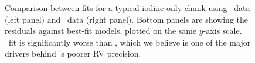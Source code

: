 \begin{figure}
\centering
{}
\caption{Comparison between fits for a typical iodine-only chunk using
  \het\ data (left panel) and \keck\ data (right panel). Bottom panels
  are showing the residuals against best-fit models, plotted on the
  same $y$-axis scale. \het\ fit is significantly worse than \keck,
  which we believe is one of the major drivers behind \het's poorer RV
  precision. 
\label{het:fig:iodchunkcomp}}
\end{figure}



